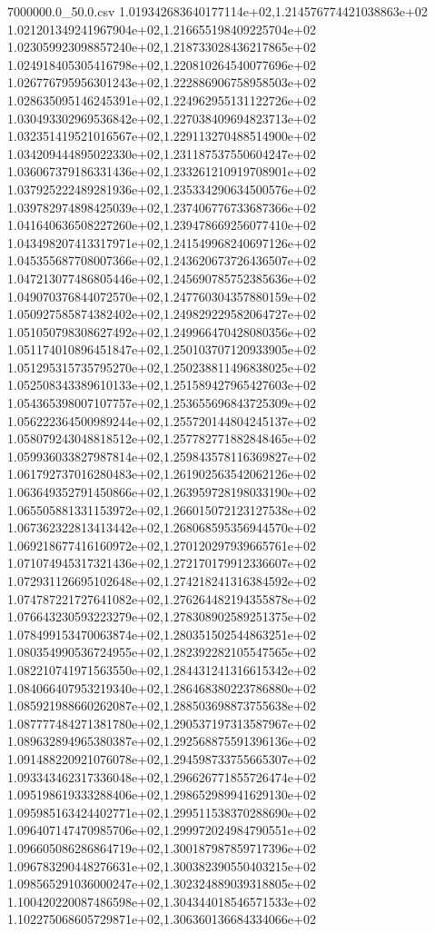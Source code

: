 \begin{filecontents*}{7000000.0_50.0.csv}
1.019342683640177114e+02,1.214576774421038863e+02
1.021201349241967904e+02,1.216655198409225704e+02
1.023059923098857240e+02,1.218733028436217865e+02
1.024918405305416798e+02,1.220810264540077696e+02
1.026776795956301243e+02,1.222886906758958503e+02
1.028635095146245391e+02,1.224962955131122726e+02
1.030493302969536842e+02,1.227038409694823713e+02
1.032351419521016567e+02,1.229113270488514900e+02
1.034209444895022330e+02,1.231187537550604247e+02
1.036067379186331436e+02,1.233261210919708901e+02
1.037925222489281936e+02,1.235334290634500576e+02
1.039782974898425039e+02,1.237406776733687366e+02
1.041640636508227260e+02,1.239478669256077410e+02
1.043498207413317971e+02,1.241549968240697126e+02
1.045355687708007366e+02,1.243620673726436507e+02
1.047213077486805446e+02,1.245690785752385636e+02
1.049070376844072570e+02,1.247760304357880159e+02
1.050927585874382402e+02,1.249829229582064727e+02
1.051050798308627492e+02,1.249966470428080356e+02
1.051174010896451847e+02,1.250103707120933905e+02
1.051295315735795270e+02,1.250238811496838025e+02
1.052508343389610133e+02,1.251589427965427603e+02
1.054365398007107757e+02,1.253655696843725309e+02
1.056222364500989244e+02,1.255720144804245137e+02
1.058079243048818512e+02,1.257782771882848465e+02
1.059936033827987814e+02,1.259843578116369827e+02
1.061792737016280483e+02,1.261902563542062126e+02
1.063649352791450866e+02,1.263959728198033190e+02
1.065505881331153972e+02,1.266015072123127538e+02
1.067362322813413442e+02,1.268068595356944570e+02
1.069218677416160972e+02,1.270120297939665761e+02
1.071074945317321436e+02,1.272170179912336607e+02
1.072931126695102648e+02,1.274218241316384592e+02
1.074787221727641082e+02,1.276264482194355878e+02
1.076643230593223279e+02,1.278308902589251375e+02
1.078499153470063874e+02,1.280351502544863251e+02
1.080354990536724955e+02,1.282392282105547565e+02
1.082210741971563550e+02,1.284431241316615342e+02
1.084066407953219340e+02,1.286468380223786880e+02
1.085921988660262087e+02,1.288503698873755638e+02
1.087777484271381780e+02,1.290537197313587967e+02
1.089632894965380387e+02,1.292568875591396136e+02
1.091488220921076078e+02,1.294598733755665307e+02
1.093343462317336048e+02,1.296626771855726474e+02
1.095198619333288406e+02,1.298652989941629130e+02
1.095985163424402771e+02,1.299511538370288690e+02
1.096407147470985706e+02,1.299972024984790551e+02
1.096605086286864719e+02,1.300187987859717396e+02
1.096783290448276631e+02,1.300382390550403215e+02
1.098565291036000247e+02,1.302324889039318805e+02
1.100420220087486598e+02,1.304344018546571533e+02
1.102275068605729871e+02,1.306360136684334066e+02

\end{filecontents*}
